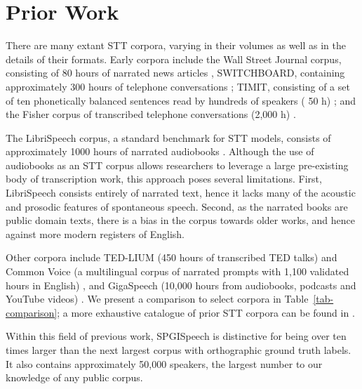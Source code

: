 \documentclass{article}
\newcommand\tabref{Table~\ref}
\begin{document}
\section{Prior Work}
There are many extant STT corpora, varying in their volumes as well as in the details of their formats.
Early corpora include the Wall Street Journal corpus,
consisting of 80 hours of narrated news articles \cite{baker92},
SWITCHBOARD, containing approximately 300 hours of telephone conversations \cite{godfrey92}; TIMIT, consisting of a set of ten
phonetically balanced sentences read by hundreds of speakers (
50 h) \cite{garofolo93}; and the Fisher corpus of transcribed
telephone conversations (2,000 h) \cite{cieri04}. 

The LibriSpeech corpus, a standard benchmark for STT models,
consists of approximately 1000 hours of narrated audiobooks
\cite{panayotov15}.  Although the use of audiobooks as an STT
corpus allows researchers to leverage a large pre-existing body of transcription work,
this approach poses several limitations.  First, LibriSpeech
consists entirely of narrated text, hence it lacks many of the
acoustic and prosodic features of spontaneous speech.  Second, as the
narrated books are public domain texts, there is a bias in the corpus
towards older works, and hence against more modern registers of
English.  

Other corpora include
TED-LIUM (450 hours of transcribed TED talks) \cite{hernandez18} and 
Common Voice (a multilingual corpus of narrated prompts with  1,100 validated
hours in English) \cite{ardila19}, and GigaSpeech (10,000 hours from audiobooks, podcasts and YouTube videos) \cite{chen21}.
We present a comparison to select corpora in \tabref{tab-comparison}; a more exhaustive
catalogue of prior STT corpora can be found in \cite{leroux14}.

Within this field of previous work, SPGISpeech is distinctive for being over ten times larger than the next largest corpus with orthographic ground truth labels.  It
also contains approximately 50,000 speakers, the largest number to our knowledge of any public corpus.
\end{document}
